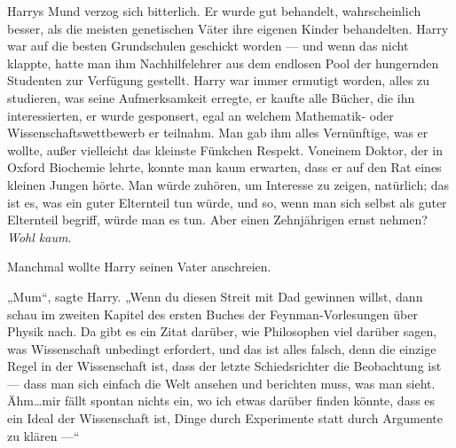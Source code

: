 Harrys Mund verzog sich bitterlich. Er wurde gut behandelt, wahrscheinlich besser, als die meisten genetischen Väter ihre eigenen Kinder behandelten. Harry war auf die besten Grundschulen geschickt worden — und wenn das nicht klappte, hatte man ihm Nachhilfelehrer aus dem endlosen Pool der hungernden Studenten zur Verfügung gestellt. Harry war immer ermutigt worden, alles zu studieren, was seine Aufmerksamkeit erregte, er kaufte alle Bücher, die ihn interessierten, er wurde gesponsert, egal an welchem Mathematik- oder Wissenschaftswettbewerb er teilnahm. Man gab ihm alles Vernünftige, was er wollte, außer vielleicht das kleinste Fünkchen Respekt. Voneinem Doktor, der in Oxford Biochemie lehrte, konnte man kaum erwarten, dass er auf den Rat eines kleinen Jungen hörte. Man würde zuhören, um Interesse zu zeigen, natürlich; das ist es, was ein guter Elternteil tun würde, und so, wenn man sich selbst als guter Elternteil begriff, würde man es tun. Aber einen Zehnjährigen ernst nehmen? \emph{Wohl kaum}.

Manchmal wollte Harry seinen Vater anschreien.

„Mum“, sagte Harry. „Wenn du diesen Streit mit Dad gewinnen willst, dann schau im zweiten Kapitel des ersten Buches der Feynman-Vorlesungen über Physik nach. Da gibt es ein Zitat darüber, wie Philosophen viel darüber sagen, was Wissenschaft unbedingt erfordert, und das ist alles falsch, denn die einzige Regel in der Wissenschaft ist, dass der letzte Schiedsrichter die Beobachtung ist — dass man sich einfach die Welt ansehen und berichten muss, was man sieht. Ähm…mir fällt spontan nichts ein, wo ich etwas darüber finden könnte, dass es ein Ideal der Wissenschaft ist, Dinge durch Experimente statt durch Argumente zu klären —“

